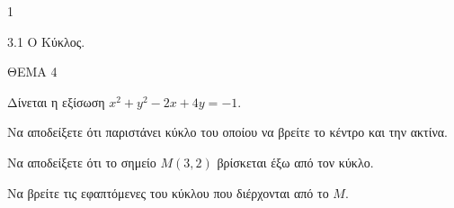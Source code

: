 \begin{ylh}{1}
    \item 3.1 Ο Κύκλος.
\end{ylh}
ΘΕΜΑ 4

Δίνεται η εξίσωση $x^2 + y^2 - 2x + 4y = -1$.
\begin{alist}
\item Να αποδείξετε ότι παριστάνει κύκλο του οποίου να βρείτε το κέντρο και την ακτίνα. 
\item Να αποδείξετε ότι το σημείο $M(3, 2)$ βρίσκεται έξω από τον κύκλο. 
\item Να βρείτε τις εφαπτόμενες του κύκλου που διέρχονται από το $M$. 
\end{alist}